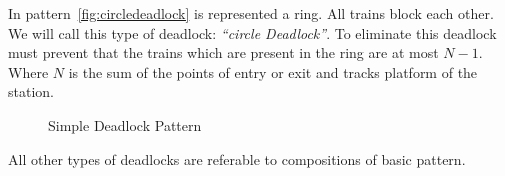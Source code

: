 \documentclass{ewic}
\begin{document}
In pattern~\ref{fig:circledeadlock} is represented a ring. All trains block each other. We will call this type of deadlock:  \emph{``circle Deadlock''}. To eliminate this deadlock must prevent that the trains which are present in the ring are at most $N-1$. Where $N$ is the sum of the points of entry or exit and tracks platform of the station.

\begin{figure}[!htp]
 \centering

 

\caption{Simple Deadlock Pattern}
 \label{fig:simpledeadlockpattern}
 \end{figure}



All other types of deadlocks are referable to compositions of basic pattern.


\end{document}
